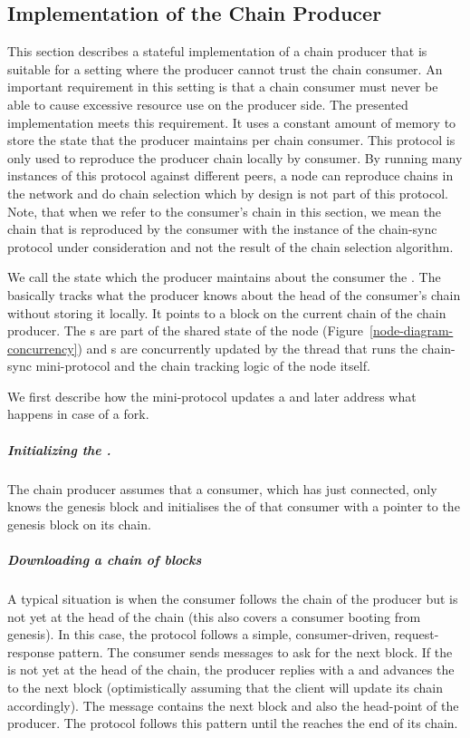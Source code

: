 \subsection{Implementation of the Chain Producer}
This section describes a stateful implementation of a chain producer that is suitable for a setting where
the producer cannot trust the chain consumer.
An important requirement in this setting
is that a chain consumer must never be able to cause excessive resource use on the producer side.
The presented implementation meets this requirement.
It uses a constant amount of memory to store the state that the producer maintains
per chain consumer.  This protocol is only used to reproduce the producer
chain locally by consumer.  By running many instances of this protocol against
different peers, a node can reproduce chains in the network and
do chain selection which by design is not part of this protocol.
Note, that when we refer to the consumer's chain in this section, we mean
the chain that is reproduced by the consumer with the instance of
the chain-sync protocol under consideration and not the result of the chain selection algorithm.

We call the state which the producer maintains about the consumer the \readpointer{}.
The \readpointer{} basically tracks what the producer knows about the head of
the consumer's chain without storing it locally.
It points to a block on the current chain of the chain producer.
The \readpointer{}s are part of the shared state of the node (Figure~\ref{node-diagram-concurrency}) and
\readpointer{}s are concurrently updated by the thread that runs the chain-sync mini-protocol and the
chain tracking logic of the node itself.

We first describe how the mini-protocol updates a \readpointer{} and later address what happens in case
of a fork.
\subparagraph{Initializing the \readpointer{}.}
The chain producer assumes that a consumer, which has just connected,
only knows the genesis block and initialises the \readpointer{} of that consumer
with a pointer to the genesis block on its chain.

\subparagraph{Downloading a chain of blocks}
A typical situation is when the consumer follows the chain of the producer but is not yet at the head of the
chain (this also covers a consumer booting from genesis).
In this case, the protocol follows a simple, consumer-driven, request-response pattern.
The consumer sends \MsgRequestNext{} messages to ask for the next block.
If the \readpointer{} is not yet at the head of the chain,
the producer replies with a \MsgRollForward{} and advances the \readpointer{} to
the next block (optimistically assuming that the client will update its chain
accordingly).
The \MsgRollForward{} message contains the next block and also the head-point of the producer.
The protocol follows this pattern until the \readpointer{} reaches the end of its chain.

